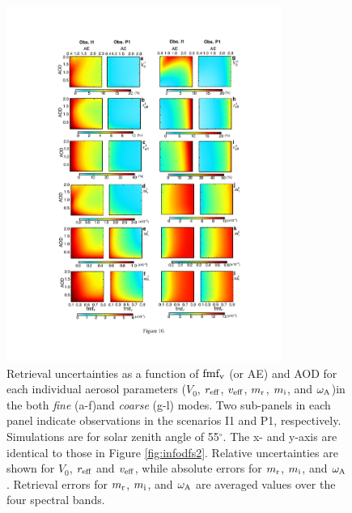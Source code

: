 \begin{figure}[p]
  \centering
  \includegraphics[width={0.8\textwidth}]{figures/info10.pdf}
  \caption{Retrieval uncertainties as a function of $\text{fmf}_\text{v}$ (or AE) and
AOD for each individual aerosol parameters ($V_0$, $r_\text{eff}$, $v_\text{eff}$,
$m_\text{r}$, $m_\text{i}$, and $\omega_\text{A}$)in the both \textit{fine} (a-f)and 
\textit{coarse} (g-l) modes.
Two sub-panels in each panel indicate observations in the scenarios 
I1 and P1, respectively. Simulations are for solar zenith angle of
55$^\circ$. The x- and y-axis are identical to those in Figure
\ref{fig:infodfs2}. Relative uncertainties are shown for
$V_0$, $r_\text{eff}$ and $v_\text{eff}$, while absolute errors for $m_\text{r}$, $m_\text{i}$, 
and $\omega_\text{A}$. Retrieval errors for $m_\text{r}$, $m_\text{i}$, 
and $\omega_\text{A}$ are averaged values over the four spectral bands.}
  \label{fig:infoerr}
\end{figure}


